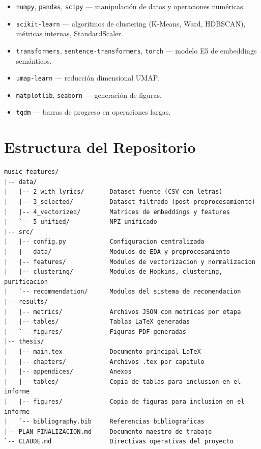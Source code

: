 \begin{itemize}[leftmargin=2em]
    \item \texttt{numpy}, \texttt{pandas}, \texttt{scipy} --- manipulación de datos y operaciones numéricas.
    \item \texttt{scikit-learn} --- algoritmos de clustering (K-Means, Ward, HDBSCAN), métricas internas, StandardScaler.
    \item \texttt{transformers}, \texttt{sentence-transformers}, \texttt{torch} --- modelo E5 de embeddings semánticos.
    \item \texttt{umap-learn} --- reducción dimensional UMAP.
    \item \texttt{matplotlib}, \texttt{seaborn} --- generación de figuras.
    \item \texttt{tqdm} --- barras de progreso en operaciones largas.
\end{itemize}

\section{Estructura del Repositorio}

\begin{verbatim}
music_features/
|-- data/
|   |-- 2_with_lyrics/       Dataset fuente (CSV con letras)
|   |-- 3_selected/          Dataset filtrado (post-preprocesamiento)
|   |-- 4_vectorized/        Matrices de embeddings y features
|   `-- 5_unified/           NPZ unificado
|-- src/
|   |-- config.py            Configuracion centralizada
|   |-- data/                Modulos de EDA y preprocesamiento
|   |-- features/            Modulos de vectorizacion y normalizacion
|   |-- clustering/          Modulos de Hopkins, clustering, purificacion
|   `-- recommendation/      Modulos del sistema de recomendacion
|-- results/
|   |-- metrics/             Archivos JSON con metricas por etapa
|   |-- tables/              Tablas LaTeX generadas
|   `-- figures/             Figuras PDF generadas
|-- thesis/
|   |-- main.tex             Documento principal LaTeX
|   |-- chapters/            Archivos .tex por capitulo
|   |-- appendices/          Anexos
|   |-- tables/              Copia de tablas para inclusion en el informe
|   |-- figures/             Copia de figuras para inclusion en el informe
|   `-- bibliography.bib     Referencias bibliograficas
|-- PLAN_FINALIZACION.md     Documento maestro de trabajo
`-- CLAUDE.md                Directivas operativas del proyecto
\end{verbatim}

